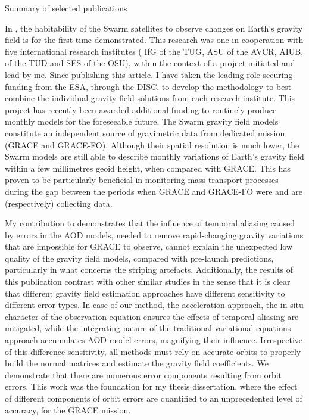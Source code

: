 
\begin{cvtext}{Summary of selected publications}

In \cite{TeixeiraEncarnacao2016}, the habitability of the Swarm satellites to observe changes on Earth's gravity field is for the first time demonstrated.
This research was one in cooperation with five international research institutes (
\acf{IfG} of the \acf{TUG},
\ac{ASU}  of the \acf{AVCR},
\acf{AIUB},
 of the \ac{TUD} and
\acf{SES} of the \acf{OSU}), 
within the context of a project initiated and lead by me.
Since publishing this article, I have taken the leading role securing funding from the \ac{ESA}, through the \ac{DISC}, to develop the methodology to best combine the individual gravity field solutions from each research institute. This project has recently been awarded additional funding to routinely produce monthly models for the foreseeable future.
The Swarm gravity field models constitute an independent source of gravimetric data from dedicated mission (\ac{GRACE} and \ac{GRACE-FO}).
Although their spatial resolution is much lower, the Swarm models are still able to describe monthly variations of Earth's gravity field within a few millimetres geoid height, when compared with \ac{GRACE}.
This has proven to be particularly beneficial in monitoring mass transport processes during the gap between the periods when \ac{GRACE} and \ac{GRACE-FO} were and are (respectively) collecting data.

My contribution to \cite{Ditmar2012} demonstrates that the influence of temporal aliasing caused by errors in the \ac{AOD} models, needed to remove rapid-changing gravity variations that are impossible for \ac{GRACE} to observe, cannot explain the unexpected low quality of the gravity field models, compared with pre-launch predictions, particularly in what concerns the striping artefacts.
Additionally, the results of this publication contrast with other similar studies in the sense that it is clear that different gravity field estimation approaches have different sensitivity to different error types.
In case of our method, the acceleration approach, the in-situ character of the observation equation ensures the effects of temporal aliasing are mitigated, while the integrating nature of the traditional variational equations approach accumulates \ac{AOD} model errors, magnifying their influence.
Irrespective of this difference sensitivity, all methods must rely on accurate orbits to properly build the normal matrices and estimate the gravity field coefficients.
We demonstrate that there are numerous error components resulting from orbit errors.
This work was the foundation for my thesis dissertation, where the effect of different components of orbit errors are quantified to an unprecedented level of accuracy, for the \ac{GRACE} mission.


\end{cvtext}
